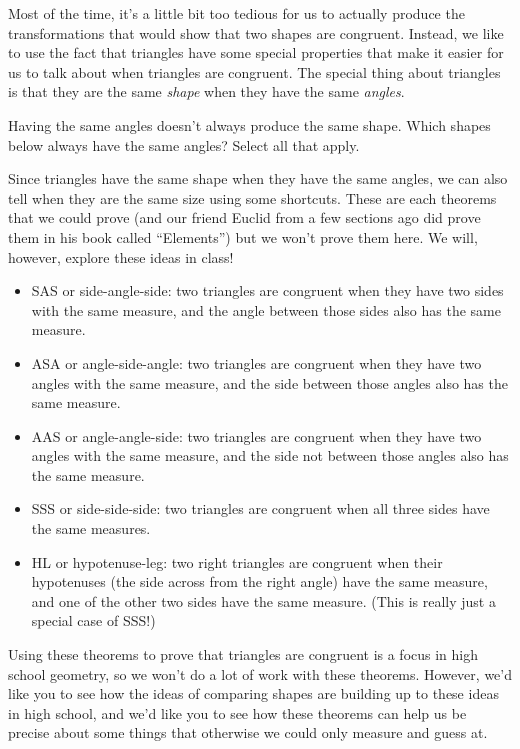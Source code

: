 \documentclass{ximera}
\begin{document}
Most of the time, it's a little bit too tedious for us to actually produce the transformations that would show that two shapes are congruent. Instead, we like to use the fact that triangles have some special properties that make it easier for us to talk about when triangles are congruent. The special thing about triangles is that they are the same \emph{shape} when they have the same \emph{angles}.
\begin{question}
Having the same angles doesn't always produce the same shape. Which shapes below always have the same angles? Select all that apply.
\begin{selectAll}
\end{selectAll}
\end{question}
Since triangles have the same shape when they have the same angles, we can also tell when they are the same size using some shortcuts. These are each theorems that we could prove (and our friend Euclid from a few sections ago did prove them in his book called ``Elements'') but we won't prove them here. We will, however, explore these ideas in class!
\begin{itemize}
	\item SAS or side-angle-side: two triangles are congruent when they have two sides with the same measure, and the angle between those sides also has the same measure.
	\item ASA or angle-side-angle: two triangles are congruent when they have two angles with the same measure, and the side between those angles also has the same measure.
	\item AAS or angle-angle-side: two triangles are congruent when they have two angles with the same measure, and the side not between those angles also has the same measure.
	\item SSS or side-side-side: two triangles are congruent when all three sides have the same measures.
	\item HL or hypotenuse-leg: two right triangles are congruent when their hypotenuses (the side across from the right angle) have the same measure, and one of the other two sides have the same measure. (This is really just a special case of SSS!)
\end{itemize}
Using these theorems to prove that triangles are congruent is a focus in high school geometry, so we won't do a lot of work with these theorems. However, we'd like you to see how the ideas of comparing shapes are building up to these ideas in high school, and we'd like you to see how these theorems can help us be precise about some things that otherwise we could only measure and guess at.
\end{document}
